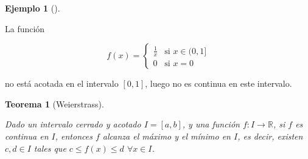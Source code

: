 \documentclass[
  a4paper,
]{scrreport}
\theoremstyle{definition}
\theoremstyle{definition}
\newtheorem{example}{Ejemplo}[chapter]
\theoremstyle{definition}
\theoremstyle{plain}
\newtheorem{theorem}{Teorema}[chapter]
\theoremstyle{plain}
\theoremstyle{plain}
\theoremstyle{remark}
\begin{document}
\begin{example}[]\protect\hypertarget{exm-función-discontinua-no-acotada}{}\label{exm-función-discontinua-no-acotada}

La función

\[
f(x)=
\begin{cases}
\frac{1}{x} & \mbox{si } x\in (0,1]\\
0 & \mbox{si } x=0
\end{cases}
\]

no está acotada en el intervalo \([0,1]\), luego no es continua en este
intervalo.

\end{example}

\begin{theorem}[Weierstrass]\protect\hypertarget{thm-weierstrass}{}\label{thm-weierstrass}

Dado un intervalo cerrado y acotado \(I=[a,b]\), y una función
\(f:I\to\mathbb{R}\), si \(f\) es continua en \(I\), entonces \(f\)
alcanza el máximo y el mínimo en \(I\), es decir, existen \(c,d\in I\)
tales que \(c\leq f(x)\leq d\) \(\forall x\in I\).

\end{theorem}
\end{document}
